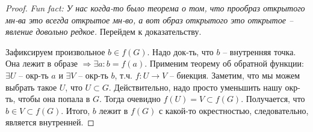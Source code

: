 \begin{proof}
    \textit{Fun fact: У нас когда-то было теорема о том, что прообраз открытого мн-ва это всегда открытое мн-во,
    а вот образ открытого это открытое -- явление довольно редкое.} 
    Перейдем к доказательству.

    \quad Зафиксируем произвольное $b \in f(G)$. 
    Надо док-ть, что $b$ -- внутренняя точка. 
    Она лежит в образе $\Rightarrow \exists a : b = f(a)$.
    Применим теорему об обратной функции: $\exists U$ -- окр-ть $a$ и $\exists V$ -- окр-ть $b$, т.ч. $f: U \to V$ -- биекция.
    Заметим, что мы можем выбрать такое $U$, что $U \subset G$. 
    Действительно, надо просто уменьшить нашу окр-ть, чтобы она попала в $G$. 
    Тогда очевидно $f(U) = V \subset f(G)$.
    Получается, что $b \in V \subset f(G)$. 
    Итого, $b$ лежит в $f(G)$ с какой-то окрестностью, следовательно, является внутренней.
\end{proof}